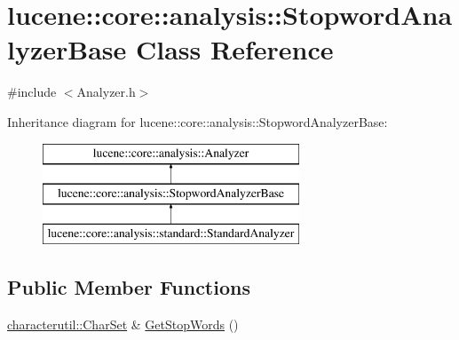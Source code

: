 \hypertarget{classlucene_1_1core_1_1analysis_1_1StopwordAnalyzerBase}{}\section{lucene\+:\+:core\+:\+:analysis\+:\+:Stopword\+Analyzer\+Base Class Reference}
\label{classlucene_1_1core_1_1analysis_1_1StopwordAnalyzerBase}


{\ttfamily \#include $<$Analyzer.\+h$>$}

Inheritance diagram for lucene\+:\+:core\+:\+:analysis\+:\+:Stopword\+Analyzer\+Base\+:\begin{figure}[H]
\begin{center}
\leavevmode
\includegraphics[height=3.000000cm]{classlucene_1_1core_1_1analysis_1_1StopwordAnalyzerBase}
\end{center}
\end{figure}
\subsection*{Public Member Functions}
\begin{DoxyCompactItemize}
\item 
\mbox{\hyperlink{classlucene_1_1core_1_1analysis_1_1characterutil_1_1CharSet}{characterutil\+::\+Char\+Set}} \& \mbox{\hyperlink{classlucene_1_1core_1_1analysis_1_1StopwordAnalyzerBase_aaa0f8763081ba7e41278a03ee5622980}{Get\+Stop\+Words}} ()
\end{DoxyCompactItemize}
